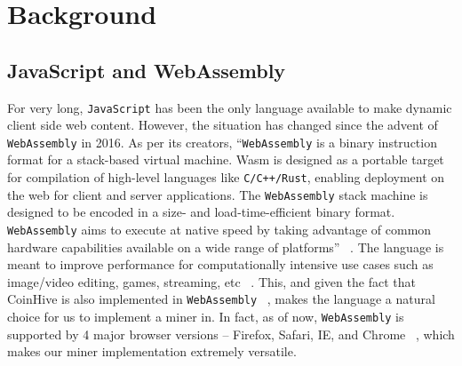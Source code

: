 \documentclass[runningheads]{llncs}
\newcommand{\trishita}[1]{{\color{magenta}\bfseries[Trishita: #1]}}
\begin{document}
\section{Background}
\subsection{JavaScript and WebAssembly}
For very long, \verb|JavaScript| has been the only language available to make dynamic client side web content. However, the situation has changed since the advent of \verb|WebAssembly| in 2016. As per its creators, ``\verb|WebAssembly| is a binary instruction format for a stack-based virtual machine. Wasm is designed as a portable target for compilation of high-level languages like \verb|C/C++/Rust|, enabling deployment on the web for client and server applications. The \verb|WebAssembly| stack machine is designed to be encoded in a size- and load-time-efficient binary format. \verb|WebAssembly| aims to execute at native speed by taking advantage of common hardware capabilities available on a wide range of platforms'' ~\cite{webAssembly}. The language is meant to improve performance for computationally intensive use cases such as image/video editing, games, streaming, etc ~\cite{webAssembly}. This, and given the fact that CoinHive is also implemented in \verb|WebAssembly| ~\cite{coinhive}, makes the language a natural choice for us to implement a miner in. In fact, as of now, \verb|WebAssembly| is supported by 4 major browser versions -- Firefox, Safari, IE, and Chrome ~\cite{webAssembly}, which makes our miner implementation extremely versatile.


\end{document}
